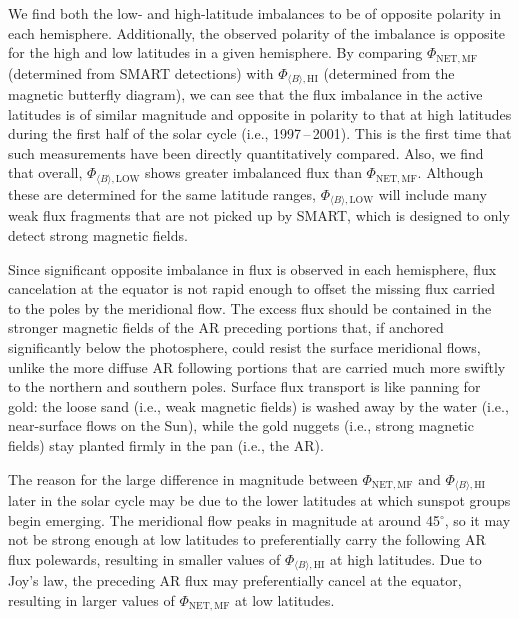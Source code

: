\documentclass[namedreferences]{solarphysics}
\newcommand{\degr}{\ensuremath{^\circ}}
\begin{document}
\begin{article}
We find both the low- and high-latitude imbalances to be of opposite polarity in each hemisphere. Additionally, the observed polarity of the imbalance is opposite for the high and low latitudes in a given hemisphere. By comparing $\Phi_{\mathrm{NET,MF}}$ (determined from SMART detections)
with $\Phi_{\langle B \rangle,\mathrm{HI}}$ (determined from the magnetic butterfly diagram), we can see that the flux imbalance in the active latitudes is of similar magnitude and opposite in polarity to that at high latitudes during the first half of the solar cycle (i.e., 1997\,--\,2001). This is the first time that such measurements have been directly quantitatively compared. Also, we find that overall, $\Phi_{\langle B \rangle,\mathrm{LOW}}$ shows greater imbalanced flux than $\Phi_{\mathrm{NET,MF}}$. Although these are determined for the same latitude ranges, $\Phi_{\langle B \rangle,\mathrm{LOW}}$ will include many weak flux fragments that are not picked up by SMART, which is designed to only detect strong magnetic fields.

Since significant opposite imbalance in flux is observed in each hemisphere, flux cancelation at the equator is not rapid enough to offset the missing flux carried to the poles by the meridional flow. 
The excess flux should be contained in the stronger magnetic fields of the AR preceding portions that, if anchored significantly below the photosphere, could resist the surface meridional flows, unlike the more diffuse AR following portions that are carried much more swiftly to the northern and southern poles. Surface flux transport is like panning for gold: the loose sand (i.e., weak magnetic fields) is washed away by the water (i.e., near-surface flows on the Sun), while the gold nuggets (i.e., strong magnetic fields) stay planted firmly in the pan (i.e., the AR).

The reason for the large difference in magnitude between $\Phi_{\mathrm{NET,MF}}$ and $\Phi_{\langle B \rangle,\mathrm{HI}}$ later in the solar cycle may be due to the lower latitudes at which sunspot groups begin emerging. The meridional flow peaks in magnitude at around 45\degr \cite{}, so it may not be strong enough at low latitudes to preferentially carry the following AR flux polewards, resulting in smaller values of $\Phi_{\langle B \rangle,\mathrm{HI}}$ at high latitudes. Due to Joy's law, the preceding AR flux may preferentially cancel at the equator, resulting in larger values of $\Phi_{\mathrm{NET,MF}}$ at low latitudes.


\end{article}
\end{document}
